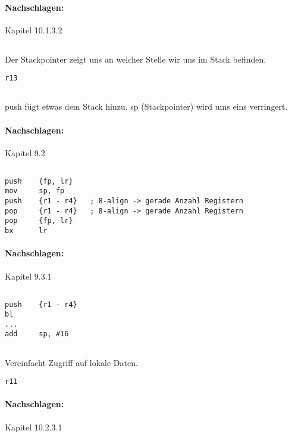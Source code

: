 \paragraph*{Nachschlagen:}
Kapitel 10.1.3.2 

\subsection{}
Der Stackpointer zeigt uns an welcher Stelle wir uns im Stack befinden.
\begin{lstlisting}
r13
\end{lstlisting}

\subsection{}
push{} fügt etwas dem Stack hinzu.
sp (Stackpointer) wird ums eins verringert.
\paragraph*{Nachschlagen:}
Kapitel 9.2

\subsection{}
\begin{lstlisting}
push 	{fp, lr}
mov 	sp, fp
push 	{r1 - r4}	; 8-align -> gerade Anzahl Registern
pop 	{r1 - r4}	; 8-align -> gerade Anzahl Registern
pop		{fp, lr}
bx		lr
\end{lstlisting}
\paragraph*{Nachschlagen:}
Kapitel 9.3.1

\subsection{}
\begin{lstlisting}
push 	{r1 - r4}
bl
...
add		sp, #16
\end{lstlisting}

\subsection{}
Vereinfacht Zugriff auf lokale Daten.
\begin{lstlisting}
r11
\end{lstlisting}
\paragraph*{Nachschlagen:}
Kapitel 10.2.3.1

